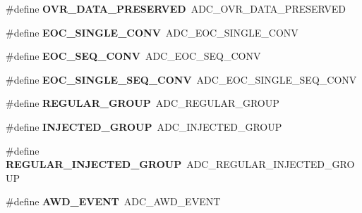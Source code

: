 \begin{DoxyCompactItemize}
\#define {\bfseries O\+V\+R\+\_\+\+D\+A\+T\+A\+\_\+\+P\+R\+E\+S\+E\+R\+V\+ED}~A\+D\+C\+\_\+\+O\+V\+R\+\_\+\+D\+A\+T\+A\+\_\+\+P\+R\+E\+S\+E\+R\+V\+ED
\item 
\mbox{\label{group___h_a_l___a_d_c___aliased___defines_ga8160cf13a85d797ef96972174a863945}} 
\#define {\bfseries E\+O\+C\+\_\+\+S\+I\+N\+G\+L\+E\+\_\+\+C\+O\+NV}~A\+D\+C\+\_\+\+E\+O\+C\+\_\+\+S\+I\+N\+G\+L\+E\+\_\+\+C\+O\+NV
\item 
\mbox{\label{group___h_a_l___a_d_c___aliased___defines_gac7022f73c8906a37c7faf511bc720dda}} 
\#define {\bfseries E\+O\+C\+\_\+\+S\+E\+Q\+\_\+\+C\+O\+NV}~A\+D\+C\+\_\+\+E\+O\+C\+\_\+\+S\+E\+Q\+\_\+\+C\+O\+NV
\item 
\mbox{\label{group___h_a_l___a_d_c___aliased___defines_ga503236c97697e9135a9d1c2c88cac7c9}} 
\#define {\bfseries E\+O\+C\+\_\+\+S\+I\+N\+G\+L\+E\+\_\+\+S\+E\+Q\+\_\+\+C\+O\+NV}~A\+D\+C\+\_\+\+E\+O\+C\+\_\+\+S\+I\+N\+G\+L\+E\+\_\+\+S\+E\+Q\+\_\+\+C\+O\+NV
\item 
\mbox{\label{group___h_a_l___a_d_c___aliased___defines_ga37bac62f24a8600f62d0d35683a0a4de}} 
\#define {\bfseries R\+E\+G\+U\+L\+A\+R\+\_\+\+G\+R\+O\+UP}~A\+D\+C\+\_\+\+R\+E\+G\+U\+L\+A\+R\+\_\+\+G\+R\+O\+UP
\item 
\mbox{\label{group___h_a_l___a_d_c___aliased___defines_gaa5d1cfe7b35cb724d898622cbd6b7894}} 
\#define {\bfseries I\+N\+J\+E\+C\+T\+E\+D\+\_\+\+G\+R\+O\+UP}~A\+D\+C\+\_\+\+I\+N\+J\+E\+C\+T\+E\+D\+\_\+\+G\+R\+O\+UP
\item 
\mbox{\label{group___h_a_l___a_d_c___aliased___defines_ga1e691aaec563e444d3965d5d98d1c47b}} 
\#define {\bfseries R\+E\+G\+U\+L\+A\+R\+\_\+\+I\+N\+J\+E\+C\+T\+E\+D\+\_\+\+G\+R\+O\+UP}~A\+D\+C\+\_\+\+R\+E\+G\+U\+L\+A\+R\+\_\+\+I\+N\+J\+E\+C\+T\+E\+D\+\_\+\+G\+R\+O\+UP
\item 
\mbox{\label{group___h_a_l___a_d_c___aliased___defines_ga21fdc6d3f5ae5c030acc0f5518fbea4a}} 
\#define {\bfseries A\+W\+D\+\_\+\+E\+V\+E\+NT}~A\+D\+C\+\_\+\+A\+W\+D\+\_\+\+E\+V\+E\+NT

\end{DoxyCompactItemize}
